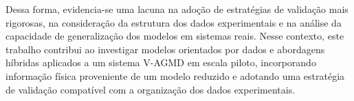 Dessa forma, evidencia-se uma lacuna na adoção de estratégias de validação mais rigorosas, na consideração da estrutura dos dados experimentais e na análise da capacidade de generalização dos modelos em sistemas reais. Nesse contexto, este trabalho contribui ao investigar modelos orientados por dados e abordagens híbridas aplicados a um sistema V-AGMD em escala piloto, incorporando informação física proveniente de um modelo reduzido e adotando uma estratégia de validação compatível com a organização dos dados experimentais.